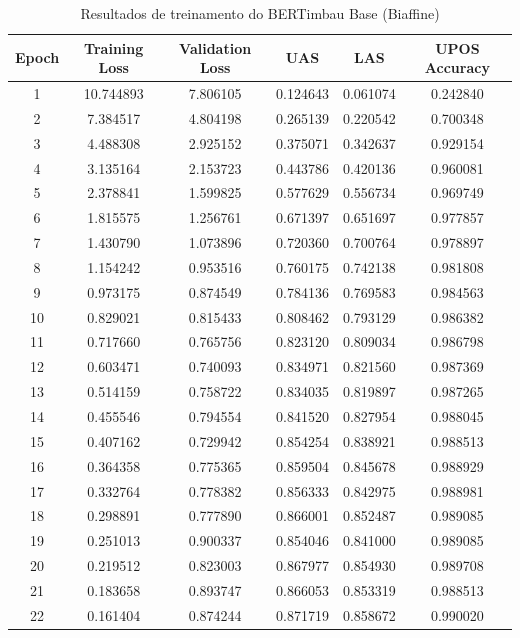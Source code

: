 \begin{table}[ht]
\centering
\caption{Resultados de treinamento do BERTimbau Base (Biaffine)}
\label{tab:bertimbau-large-biaffine}
\begin{tabular}{c c c c c c}
\hline
\textbf{Epoch} & \textbf{Training Loss} & \textbf{Validation Loss} & \textbf{UAS} & \textbf{LAS} & \textbf{UPOS Accuracy} \\
\hline
1 & 10.744893 & 7.806105 & 0.124643 & 0.061074 & 0.242840 \\
2 & 7.384517 & 4.804198 & 0.265139 & 0.220542 & 0.700348 \\
3 & 4.488308 & 2.925152 & 0.375071 & 0.342637 & 0.929154 \\
4 & 3.135164 & 2.153723 & 0.443786 & 0.420136 & 0.960081 \\
5 & 2.378841 & 1.599825 & 0.577629 & 0.556734 & 0.969749 \\
6 & 1.815575 & 1.256761 & 0.671397 & 0.651697 & 0.977857 \\
7 & 1.430790 & 1.073896 & 0.720360 & 0.700764 & 0.978897 \\
8 & 1.154242 & 0.953516 & 0.760175 & 0.742138 & 0.981808 \\
9 & 0.973175 & 0.874549 & 0.784136 & 0.769583 & 0.984563 \\
10 & 0.829021 & 0.815433 & 0.808462 & 0.793129 & 0.986382 \\
11 & 0.717660 & 0.765756 & 0.823120 & 0.809034 & 0.986798 \\
12 & 0.603471 & 0.740093 & 0.834971 & 0.821560 & 0.987369 \\
13 & 0.514159 & 0.758722 & 0.834035 & 0.819897 & 0.987265 \\
14 & 0.455546 & 0.794554 & 0.841520 & 0.827954 & 0.988045 \\
15 & 0.407162 & 0.729942 & 0.854254 & 0.838921 & 0.988513 \\
16 & 0.364358 & 0.775365 & 0.859504 & 0.845678 & 0.988929 \\
17 & 0.332764 & 0.778382 & 0.856333 & 0.842975 & 0.988981 \\
18 & 0.298891 & 0.777890 & 0.866001 & 0.852487 & 0.989085 \\
19 & 0.251013 & 0.900337 & 0.854046 & 0.841000 & 0.989085 \\
20 & 0.219512 & 0.823003 & 0.867977 & 0.854930 & 0.989708 \\
21 & 0.183658 & 0.893747 & 0.866053 & 0.853319 & 0.988513 \\
22 & 0.161404 & 0.874244 & 0.871719 & 0.858672 & 0.990020 \\

\end{tabular}
\end{table}
